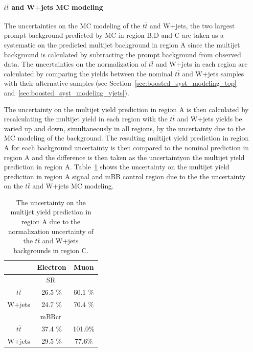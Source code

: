 \paragraph{$t\bar{t}$ and W+jets MC modeling}
 The uncertainties on the MC modeling
of the $t\bar{t}$ and W+jets, the two largest prompt background predicted by MC in region B,D and C
are taken as a systematic on the predicted multijet background in region A since the multijet
background is calculated by subtracting the prompt background from observed data. The uncertainties
on the normalization of $t\bar{t}$ and W+jets in each region are calculated by comparing the yields
between the nominal $t\bar{t}$ and W+jets samples with their alternative samples
(see Section~\ref{sec:boosted_syst_modeling_top} and~\ref{sec:boosted_syst_modeling_vjets}).
 
The uncertainty on the multijet yield prediction in region A is then calculated
by recalculating the multijet yield in each region with the $t\bar{t}$ and W+jets
yields be varied up and down, simultaneously in all regions, by the uncertainty due to the
MC modeling of the background. The resulting multijet yield prediction in region A for
each background uncertainty is then compared to the nominal prediction in region A and the difference is
then taken as the uncertaintyon the multijet yield prediction in region A.
Table~\ref{tab:boosted_syst_qcd_norm_ttbarwjetsregionc} shows the uncertainty on the multijet yield prediction
in region A signal and mBB control region  due to the the uncertainty on the $t\bar{t}$ and W+jets
MC modeling.
 
\begin{table}[!htbp]
\begin{center}
\begin{tabular}{c|c|c}
& Electron  & Muon  \\  
\hline
\multicolumn{3}{c}{SR} \\
\hline
$t\bar{t}$           &     26.5 \% &   60.1 \%  \\
W+jets               &     24.7 \% &   70.4 \%  \\
\hline
\multicolumn{3}{c}{mBBcr} \\
\hline
$t\bar{t}$           &  37.4  \%  &   101.0\%  \\
W+jets               &  29.5  \%  &   77.6\%   \\
\hline
\end{tabular}
\end{center}
\caption{The uncertainty on the multijet yield prediction in region A due to the normalization
uncertainty of the $t\bar{t}$ and W+jets backgrounds in region C.}
\label{tab:boosted_syst_qcd_norm_ttbarwjetsregionc}
\end{table}
 
